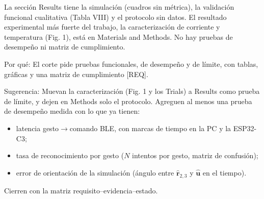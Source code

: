 \documentclass{LabDSTresponse}
\begin{document}
{La sección Results tiene la simulación (cuadros sin métrica), la validación funcional cualitativa (Tabla VIII) y el protocolo sin datos. El resultado experimental más fuerte del trabajo, la caracterización de corriente y temperatura (Fig. 1), está en Materials and Methods. No hay pruebas de desempeño ni matriz de cumplimiento.

Por qué: El corte pide pruebas funcionales, de desempeño y de límite, con tablas, gráficas y una matriz de cumplimiento [REQ].

Sugerencia: Muevan la caracterización (Fig. 1 y los Trials) a Results como prueba de límite, y dejen en Methods solo el protocolo. Agreguen al menos una prueba de desempeño medida con lo que ya tienen:
\begin{itemize}
    \item latencia gesto$\to$comando BLE, con marcas de tiempo en la PC y la ESP32-C3;
    \item tasa de reconocimiento por gesto ($N$ intentos por gesto, matriz de confusión);
    \item error de orientación de la simulación (ángulo entre $\hat{\mathbf{r}}_{2,3}$ y $\hat{\mathbf{u}}$ en el tiempo).
\end{itemize}
Cierren con la matriz requisito–evidencia–estado.}
\end{document}
